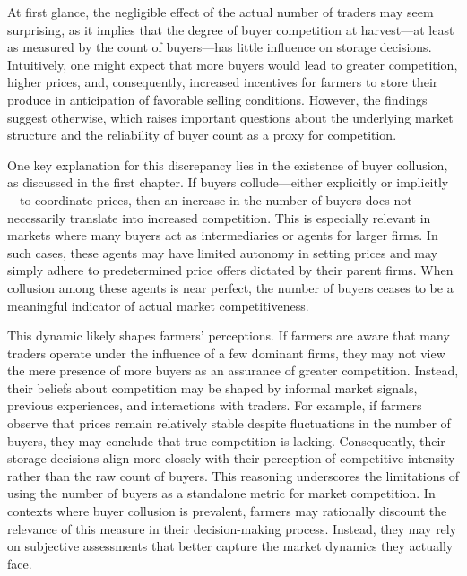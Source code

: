 \documentclass[12pt]{article}
\begin{document}
At first glance, the negligible effect of the actual number of traders may seem surprising, as it implies that the degree of buyer competition at harvest—at least as measured by the count of buyers—has little influence on storage decisions. Intuitively, one might expect that more buyers would lead to greater competition, higher prices, and, consequently, increased incentives for farmers to store their produce in anticipation of favorable selling conditions. However, the findings suggest otherwise, which raises important questions about the underlying market structure and the reliability of buyer count as a proxy for competition.

One key explanation for this discrepancy lies in the existence of buyer collusion, as discussed in the first chapter. If buyers collude—either explicitly or implicitly—to coordinate prices, then an increase in the number of buyers does not necessarily translate into increased competition. This is especially relevant in markets where many buyers act as intermediaries or agents for larger firms. In such cases, these agents may have limited autonomy in setting prices and may simply adhere to predetermined price offers dictated by their parent firms. When collusion among these agents is near perfect, the number of buyers ceases to be a meaningful indicator of actual market competitiveness.

This dynamic likely shapes farmers' perceptions. If farmers are aware that many traders operate under the influence of a few dominant firms, they may not view the mere presence of more buyers as an assurance of greater competition. Instead, their beliefs about competition may be shaped by informal market signals, previous experiences, and interactions with traders. For example, if farmers observe that prices remain relatively stable despite fluctuations in the number of buyers, they may conclude that true competition is lacking. Consequently, their storage decisions align more closely with their perception of competitive intensity rather than the raw count of buyers. This reasoning underscores the limitations of using the number of buyers as a standalone metric for market competition. In contexts where buyer collusion is prevalent, farmers may rationally discount the relevance of this measure in their decision-making process. Instead, they may rely on subjective assessments that better capture the market dynamics they actually face.
\end{document}
